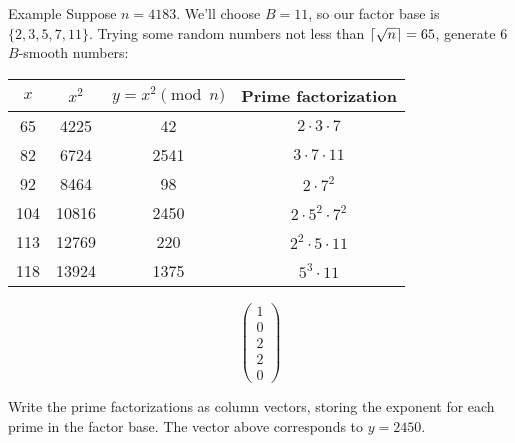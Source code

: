 \documentclass[aspectratio=169]{beamer}
\begin{document}
\begin{frame}{Example}
  Suppose $n = 4183$. We'll choose $B = 11$, so our factor base is $\{2, 3, 5, 7, 11\}$.
  Trying some random numbers not less than $\left\lceil \sqrt{n} \right\rceil = 65$,
  generate 6 $B$-smooth numbers: \pause

  \begin{minipage}[c]{0.8 \textwidth}
  \begin{tabular}{c|c|c|c}
    $x$ & $x^2$ & $y = x^2 \pmod{n}$ & Prime factorization \\
    \hline
    65 & 4225 & 42 & $2 \cdot 3 \cdot 7$ \\
    82 & 6724 & 2541 & $3 \cdot 7 \cdot 11$ \\
    92 & 8464 & 98 & $2 \cdot 7^2$ \\
    104 & 10816 & 2450 & $2 \cdot 5^2 \cdot 7^2$ \\
    113 & 12769 & 220 & $2^2 \cdot 5 \cdot 11$ \\
    118 & 13924 & 1375 & $5^3 \cdot 11$ \\
  \end{tabular} \pause
  \end{minipage}
  \begin{minipage}[c]{0.1 \textwidth}
  \[\begin{pmatrix}
    1 \\ 0 \\ 2 \\ 2 \\ 0
  \end{pmatrix}\]
  \end{minipage}
  
  Write the prime factorizations as column vectors, storing the exponent
  for each prime in the factor base. The vector above corresponds to $y = 2450$.
\end{frame}
\end{document}
